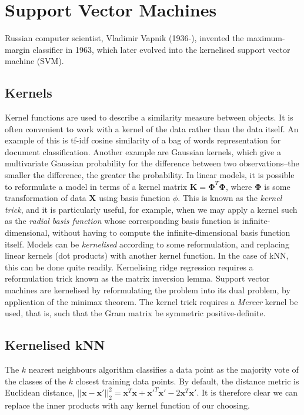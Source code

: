 \documentclass[11pt]{amsart}
\begin{document}
\section{Support Vector Machines}

Russian computer scientist, Vladimir Vapnik (1936-), invented the maximum-margin classifier in 1963, which later evolved into the kernelised support vector machine (SVM).

\subsection{Kernels}

Kernel functions are used to describe a similarity measure between objects. It is often convenient to work with a kernel of the data rather than the data itself. An example of this is tf-idf cosine similarity of a bag of words representation for document classification. Another example are Gaussian kernels, which give a multivariate Gaussian probability for the difference between two observations--the smaller the difference, the greater the probability. In linear models, it is possible to reformulate a model in terms of a kernel matrix $\mathbf{K} = \boldsymbol\Phi^T\boldsymbol\Phi$, where $\boldsymbol\Phi$ is some transformation of data $\mathbf{X}$ using basis function $\phi$. This is known as the \emph{kernel trick}, and it is particularly useful, for example, when we may apply a kernel such as the \emph{radial basis function} whose corresponding basis function is infinite-dimensional, without having to compute the infinite-dimensional basis function itself. Models can be \emph{kernelised} according to some reformulation, and replacing linear kernels (dot products) with another kernel function. In the case of kNN, this can be done quite readily. Kernelising ridge regression requires a reformulation trick known as the matrix inversion lemma. Support vector machines are kernelised by reformulating the problem into its dual problem, by application of the minimax theorem. The kernel trick requires a \emph{Mercer} kernel be used, that is, such that the Gram matrix be symmetric positive-definite.

\subsection{Kernelised kNN}

The $k$ nearest neighbours algorithm classifies a data point as the majority vote of the classes of the $k$ closest training data points. By default, the distance metric is Euclidean distance, $||\mathbf{x} - \mathbf{x}'||_2^2 = \mathbf{x}^T\mathbf{x} + \mathbf{x}'^T\mathbf{x}' - 2\mathbf{x}^T\mathbf{x}'$. It is therefore clear we can replace the inner products with any kernel function of our choosing.
\end{document}

